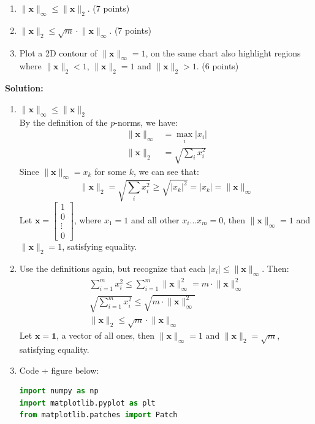 \documentclass[11pt,letterpaper]{article}
\begin{document}
\begin{enumerate}
\begin{enumerate}
    \item $\lVert \mathbf{x} \rVert_\infty \le \lVert \mathbf{x} \rVert_2$. (7 points)
    \item $\lVert \mathbf{x} \rVert_2 \le \sqrt{m} \cdot \lVert \mathbf{x} \rVert_\infty$. (7 points)
    \item Plot a 2D contour of $\lVert \mathbf{x} \rVert_\infty = 1$, on the same chart also highlight regions where $\lVert \mathbf{x}\rVert_2  < 1$, $\lVert \mathbf{x}\rVert_2  = 1$ and $\lVert \mathbf{x}\rVert_2  > 1$. (6 points)
\end{enumerate}

\textbf{Solution:}

\begin{enumerate}
    \item $\lVert \mathbf{x} \rVert_\infty \le \lVert \mathbf{x} \rVert_2$\\
    By the definition of the $p$-norms, we have:
    \begin{align*}
        \lVert \mathbf{x} \rVert_\infty &= \max_i |x_i| \\
        \lVert \mathbf{x} \rVert_2 &= \sqrt{\sum_i x_i^2}
    \end{align*}
    Since $\lVert \mathbf{x} \rVert_\infty = x_k$ for some $k$, we can see that:
    \[
        \lVert \mathbf{x} \rVert_2 = \sqrt{\sum_i x_i^2} \geq \sqrt{|x_k|^2} = |x_k| = \lVert \mathbf{x} \rVert_\infty
    \]
    Let $\mathbf{x} = \begin{bmatrix} 1 \\ 0 \\ \vdots \\ 0 \end{bmatrix}$, where $x_1 = 1$ and all other $x_i \dots x_m = 0$, then $\lVert \mathbf{x} \rVert_\infty = 1$ and $\lVert \mathbf{x} \rVert_2 = 1$, satisfying equality.
    \item Use the definitions again, but recognize that each $|x_i| \leq \lVert \mathbf{x} \rVert_\infty$. Then:
    \begin{align*}
        \sum_{i=1}^{m} x_i^2 \leq \sum_{i=1}^{m} \lVert \mathbf{x} \rVert_\infty^2 = m \cdot \lVert \mathbf{x} \rVert_\infty^2 \\
        \sqrt{\sum_{i=1}^{m} x_i^2} \leq \sqrt{m \cdot \lVert \mathbf{x} \rVert_\infty^2}\\
        \lVert \mathbf{x} \rVert_2 \leq \sqrt{m} \cdot \lVert \mathbf{x} \rVert_\infty
    \end{align*}
    Let $\mathbf{x} = \mathbf{1}$, a vector of all ones, then $\lVert \mathbf{x} \rVert_\infty = 1$ and $\lVert \mathbf{x} \rVert_2 = \sqrt{m}$, satisfying equality.
    \item Code + figure below:
\begin{lstlisting}[language=python]
import numpy as np
import matplotlib.pyplot as plt
from matplotlib.patches import Patch


\end{lstlisting}
\end{enumerate}
\end{enumerate}
\end{document}

